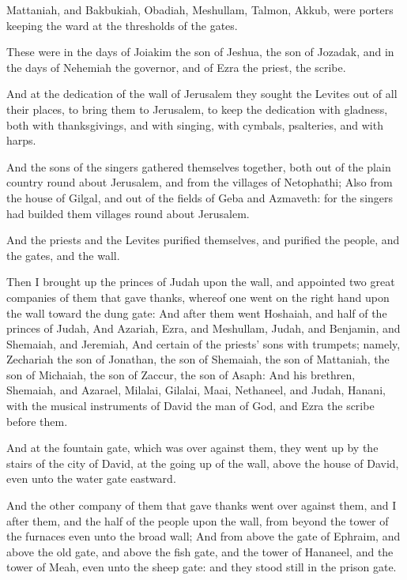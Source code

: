 \verse Mattaniah, and Bakbukiah, Obadiah, Meshullam, Talmon, Akkub, were porters keeping the ward at the thresholds of the gates.

\verse These were in the days of Joiakim the son of Jeshua, the son of Jozadak, and in the days of Nehemiah the governor, and of Ezra the priest, the scribe.

\verse And at the dedication of the wall of Jerusalem they sought the Levites out of all their places, to bring them to Jerusalem, to keep the dedication with gladness, both with thanksgivings, and with singing, with cymbals, psalteries, and with harps.

\verse And the sons of the singers gathered themselves together, both out of the plain country round about Jerusalem, and from the villages of Netophathi; \verse Also from the house of Gilgal, and out of the fields of Geba and Azmaveth: for the singers had builded them villages round about Jerusalem.

\verse And the priests and the Levites purified themselves, and purified the people, and the gates, and the wall.

\verse Then I brought up the princes of Judah upon the wall, and appointed two great companies of them that gave thanks, whereof one went on the right hand upon the wall toward the dung gate: \verse And after them went Hoshaiah, and half of the princes of Judah, \verse And Azariah, Ezra, and Meshullam, \verse Judah, and Benjamin, and Shemaiah, and Jeremiah, \verse And certain of the priests' sons with trumpets; namely, Zechariah the son of Jonathan, the son of Shemaiah, the son of Mattaniah, the son of Michaiah, the son of Zaccur, the son of Asaph: \verse And his brethren, Shemaiah, and Azarael, Milalai, Gilalai, Maai, Nethaneel, and Judah, Hanani, with the musical instruments of David the man of God, and Ezra the scribe before them.

\verse And at the fountain gate, which was over against them, they went up by the stairs of the city of David, at the going up of the wall, above the house of David, even unto the water gate eastward.

\verse And the other company of them that gave thanks went over against them, and I after them, and the half of the people upon the wall, from beyond the tower of the furnaces even unto the broad wall; \verse And from above the gate of Ephraim, and above the old gate, and above the fish gate, and the tower of Hananeel, and the tower of Meah, even unto the sheep gate: and they stood still in the prison gate.

